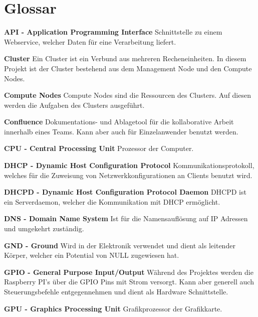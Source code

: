 \section*{Glossar}
\textbf{API - Application Programming Interface}
Schnittstelle zu einem Webservice, welcher Daten für eine Verarbeitung liefert.

\textbf{Cluster}\newline
Ein Cluster ist ein Verbund aus mehreren Recheneinheiten. In diesem Projekt ist der Cluster bestehend aus dem Management Node und den Compute Nodes.

\textbf{Compute Nodes}\newline
Compute Nodes sind die Ressourcen des Clusters. Auf diesen werden die Aufgaben des Clusters ausgeführt.

\textbf{Confluence}\newline
Dokumentations- und Ablagetool für die kollaborative Arbeit innerhalb eines Teams. Kann aber auch für Einzelanwender benutzt werden. 

\textbf{CPU - Central Processing Unit}\newline
Prozessor der Computer.

\textbf{DHCP - Dynamic Host Configuration Protocol}\newline
Kommunikationsprotokoll, welches für die Zuweisung von Netzwerkkonfigurationen an Clients benutzt wird.

\textbf{DHCPD - Dynamic Host Configuration Protocol Daemon}\newline
DHCPD ist ein Serverdaemon, welcher die Kommunikation mit DHCP ermöglicht.

\textbf{DNS - Domain Name System}\newline
Ist für die Namensauflösung auf IP Adressen und umgekehrt zuständig.

\textbf{GND - Ground}\newline
Wird in der Elektronik verwendet und dient als leitender Körper, welcher ein Potential von NULL zugewiesen hat. 

\textbf{GPIO - General Purpose Input/Output}\newline
Während des Projektes werden die Raspberry PI's über die GPIO Pins mit Strom versorgt. Kann aber generell auch Steuerungsbefehle entgegennehmen und dient als Hardware Schnittstelle.

\textbf{GPU - Graphics Processing Unit}\newline
Grafikprozessor der Grafikkarte.

